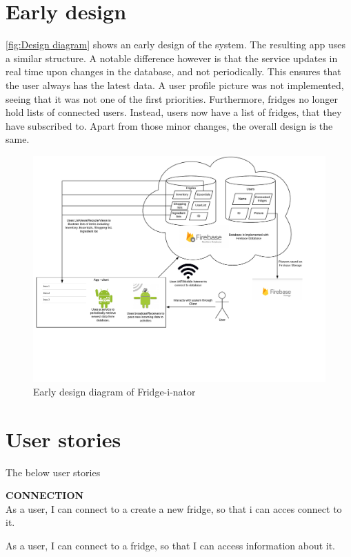 \documentclass[12pt]{article}
\begin{document}
\section{Early design}
\autoref{fig:Design diagram} shows an early design of the system. The resulting app uses a similar structure. A notable difference however is that the service updates in real time upon changes in the database, and not periodically. This ensures that the user always has the latest data. A user profile picture was not implemented, seeing that it was not one of the first priorities. Furthermore, fridges no longer hold lists of connected users. Instead, users now have a list of fridges, that they have subscribed to. Apart from those minor changes, the overall design is the same.
\begin{figure}[H]
	\centering
	\includegraphics[width=180mm]{Img/Fridge_some_diagram.pdf}
	\caption{Early design diagram of Fridge-i-nator}
	\label{fig:Design diagram}
\end{figure}

\section{User stories}
The below user stories 

\textbf{CONNECTION}\\

As a user, I can connect to a create a new fridge, so that i can acces connect to it.

As a user, I can connect to a fridge, so that I can access information about it.
\end{document}
